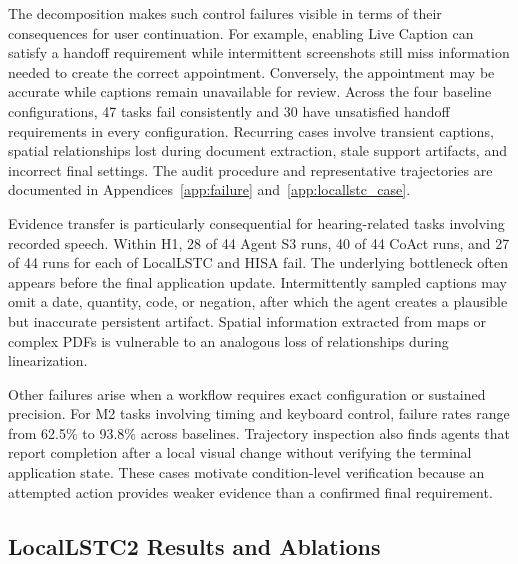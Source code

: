 \documentclass[11pt]{article}
\begin{document}
The decomposition makes such control failures visible in terms of their consequences for user continuation. For example, enabling Live Caption can satisfy a handoff requirement while intermittent screenshots still miss information needed to create the correct appointment. Conversely, the appointment may be accurate while captions remain unavailable for review. Across the four baseline configurations, 47 tasks fail consistently and 30 have unsatisfied handoff requirements in every configuration. Recurring cases involve transient captions, spatial relationships lost during document extraction, stale support artifacts, and incorrect final settings. The audit procedure and representative trajectories are documented in Appendices~\ref{app:failure} and~\ref{app:locallstc_case}.

Evidence transfer is particularly consequential for hearing-related tasks involving recorded speech. Within H1, 28 of 44 Agent S3 runs, 40 of 44 CoAct runs, and 27 of 44 runs for each of LocalLSTC and HISA fail. The underlying bottleneck often appears before the final application update. Intermittently sampled captions may omit a date, quantity, code, or negation, after which the agent creates a plausible but inaccurate persistent artifact. Spatial information extracted from maps or complex PDFs is vulnerable to an analogous loss of relationships during linearization.

Other failures arise when a workflow requires exact configuration or sustained precision. For M2 tasks involving timing and keyboard control, failure rates range from 62.5\% to 93.8\% across baselines. Trajectory inspection also finds agents that report completion after a local visual change without verifying the terminal application state. These cases motivate condition-level verification because an attempted action provides weaker evidence than a confirmed final requirement.

\subsection{LocalLSTC2 Results and Ablations}
\label{sec:method-evaluation}

\begin{table}[t]
\centering
\small
{}
\caption{Controlled 60-task comparison and ablations. Scores are arithmetic means on a 0--100 scale, while efficiency values are per-run means. LocalLSTC timing was not retained in the matched summary.}
\label{tab:method-small}
\end{table}
\end{document}
